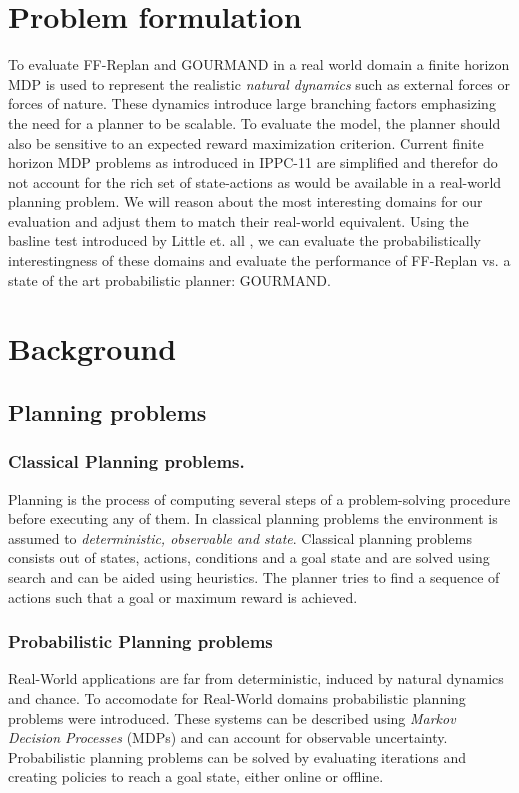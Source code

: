 \documentclass[runningheads,a4paper]{llncs}
\begin{document}
\section{Problem formulation}
To evaluate FF-Replan and GOURMAND in a real world domain a finite horizon MDP is used to represent the realistic \emph{natural dynamics} such as external forces or forces of nature. These dynamics introduce large branching factors emphasizing the need for a planner to be scalable. To evaluate the model, the planner should also be sensitive to an expected reward maximization criterion. 
Current finite horizon MDP problems as introduced in IPPC-11 are simplified and therefor do not account for the rich set of state-actions as would be available in a real-world planning problem. We will reason about the most interesting domains for our evaluation and adjust them to match their real-world equivalent. Using the basline test introduced by Little et. all \cite{little2007probvsreplan}, we can evaluate the probabilistically interestingness of these domains and evaluate the performance of FF-Replan vs. a state of the art probabilistic planner: GOURMAND. 




\section{Background}

\subsection{Planning problems}
\subsubsection{Classical Planning problems. } Planning is the process of computing several steps of a problem-solving procedure before executing any of them. In classical planning problems the environment is assumed to \emph{deterministic, observable and state}. Classical planning problems consists out of states, actions, conditions and a goal state and are solved using search and can be aided using heuristics. The planner tries to find a sequence of actions such that a goal or maximum reward is achieved. 

\subsubsection{Probabilistic Planning problems} 
Real-World applications are far from deterministic, induced by natural dynamics and chance. To accomodate for Real-World domains probabilistic planning problems were introduced.  These systems can be described using \emph{Markov Decision Processes} (MDPs) and can account for observable uncertainty. Probabilistic planning problems can be solved by evaluating iterations and creating policies to reach a goal state, either online or offline. 
\end{document}

